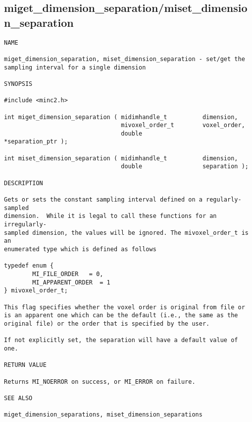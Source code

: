 \documentclass{article}
\begin{document}
\subsection{miget\_dimension\_separation/miset\_dimension\_separation}
\begin{verbatim}
NAME

miget_dimension_separation, miset_dimension_separation - set/get the 
sampling interval for a single dimension

SYNOPSIS

#include <minc2.h>

int miget_dimension_separation ( midimhandle_t          dimension,
                                 mivoxel_order_t        voxel_order,
                                 double                 *separation_ptr );

int miset_dimension_separation ( midimhandle_t          dimension,
                                 double                 separation );

DESCRIPTION

Gets or sets the constant sampling interval defined on a regularly-sampled
dimension.  While it is legal to call these functions for an irregularly-
sampled dimension, the values will be ignored. The mivoxel_order_t is an 
enumerated type which is defined as follows

typedef enum {
        MI_FILE_ORDER   = 0,
        MI_APPARENT_ORDER  = 1
} mivoxel_order_t;

This flag specifies whether the voxel order is original from file or
is an apparent one which can be the default (i.e., the same as the 
original file) or the order that is specified by the user.

If not explicitly set, the separation will have a default value of one.

RETURN VALUE

Returns MI_NOERROR on success, or MI_ERROR on failure.

SEE ALSO

miget_dimension_separations, miset_dimension_separations
\end{verbatim}
\end{document}
